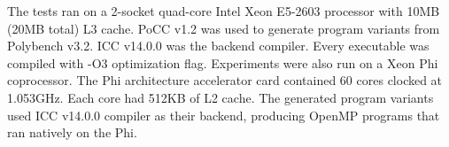 The tests ran on a 2-socket quad-core Intel Xeon E5-2603 processor with 10MB (20MB total) L3 cache.
PoCC v1.2 was used to generate program variants from Polybench v3.2. ICC v14.0.0 was the backend compiler. Every executable was compiled with
-O3 optimization flag. Experiments were also run on a Xeon Phi coprocessor. 
The Phi architecture accelerator card contained 60 cores clocked at 1.053GHz. Each core had 512KB of L2 cache. 
The generated program variants used ICC v14.0.0 compiler as their backend, producing OpenMP programs that ran natively on the Phi.
